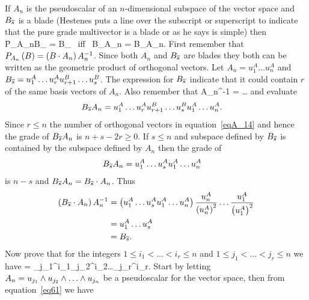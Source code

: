 If $A_{n}$ is the pseudoscalar of an $n$-dimensional subspace of the vector space and $B_{\overline{s}}$ is a blade (Hestenes puts a line over
the subscript or superscript to indicate that the pure grade multivector is a blade or as he says is simple) then
\be
	\f{P_{A_{n}}}{B_{}} = B_{} \mbox{ iff } B_{}A_{n} = B_{}\cdot A_{n}.
\ee
First remember that ${P_{A_{n}}}\left ( {B} \right ) = \left ( {B\cdot A_{n}} \right ) A_{n}^{-1}$.  Since both $A_{n}$ and $B_{\overline{s}}$ are blades they both can be written
as the geometric product of orthogonal vectors.  Let $A_{n} = u^{A}_{1}\dots u^{A}_{n}$ and 
$B_{\overline{s}} = u^{A}_{1}\dots u^{A}_{r}u^{B}_{r+1}\dots u^{B}_{s}$.  The expression for $B_{\overline{s}}$ indicate that it could contain $r$ of 
the same basis vectors of $A_{n}$. Also remember that
\be
	A_{n}^{-1} = \dots{}
\ee
and evaluate
\begin{align}
	B_{\overline{s}}A_{n} &= u^{A}_{1}\dots u^{A}_{r}u^{B}_{r+1}\dots u^{B}_{s}u^{A}_{1}\dots u^{A}_{n}. \label{eqA_14}
\end{align}
Since $r \le n$ the number of orthogonal vectors in equation~\ref{eqA_14} and hence the grade of $B_{\overline{s}}A_{n}$ is  $n+s-2r \ge 0$. If
$s \le n$ and subspace defined by $B_{\overline{s}}$ is contained by the subspace defined by $A_{n}$ then the grade of
\begin{align}
	B_{\overline{s}}A_{n} &= u^{A}_{1}\dots u^{A}_{s}u^{A}_{1}\dots u^{A}_{n} \label{eqA_15}
\end{align}
is $n-s$ and $B_{\overline{s}}A_{n} = B_{\overline{s}}\cdot A_{n}$. Thus
\begin{align}
	\left ( {B_{\overline{s}}\cdot A_{n}} \right ) A_{n}^{-1} &= \left ( {u^{A}_{1}\dots u^{A}_{s}u^{A}_{1}\dots u^{A}_{n}} \right )
	                                            \displaystyle\frac{u^{A}_{n}}{\left ( {u^{A}_{n}} \right )^{2}}\dots\displaystyle\frac{u^{A}_{1}}{\left ( {u^{A}_{1}} \right )^{2}} \nonumber \\
	                                         &= u^{A}_{1}\dots u^{A}_{s} \nonumber \\
	                                         &= B_{\overline{s}}.	                                
\end{align}
Now prove that for the integers $1\le i_{1}<\dots<i_{r}\le n$ and $1\le j_{1}<\dots<j_{r}\le n$ we have
\be
	\cdot{} = \delta_{j_{1}}^{i_{1}}\delta_{j_{2}}^{i_{2}}\dots\delta_{j_{r}}^{i_{r}}.
\ee
Start by letting $A_{n} = u_{j_{1}}\W u_{j_{2}}\W\dots\W u_{j_{n}}$ be a pseudoscalar for the vector space, then from equation~\ref{eq61} we have
